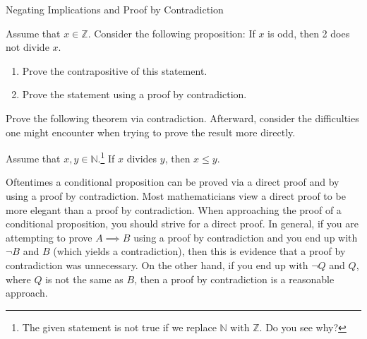 \begin{section}{Negating Implications and Proof by Contradiction}
\begin{skeleton}
\begin{center}
\end{center}
\end{skeleton}

\begin{problem}
Assume that $x\in\mathbb{Z}$.  Consider the following proposition: If $x$ is odd, then 2 does not divide $x$.
\begin{enumerate}[label=\textrm{(\alph*)}]
\item Prove the contrapositive of this statement.
\item Prove the statement using a proof by contradiction.
\end{enumerate}
\end{problem}

Prove the following theorem via contradiction. Afterward, consider the difficulties one might encounter when trying to prove the result more directly.

\begin{theorem}
Assume that $x,y\in\mathbb{N}$.\footnote{The given statement is not true if we replace $\mathbb{N}$ with $\mathbb{Z}$. Do you see why?} If $x$ divides $y$, then $x\leq y$.
\end{theorem}

Oftentimes a conditional proposition can be proved via a direct proof and by using a proof by contradiction.  Most mathematicians view a direct proof to be more elegant than a proof by contradiction. When approaching the proof of a conditional proposition, you should strive for a direct proof.  In general, if you are attempting to prove $A\implies B$ using a proof by contradiction and you end up with $\neg B$ and $B$ (which yields a contradiction), then this is evidence that a proof by contradiction was unnecessary.  On the other hand, if you end up with $\neg Q$ and $Q$, where $Q$ is not the same as $B$, then a proof by contradiction is a reasonable approach.

\end{section}